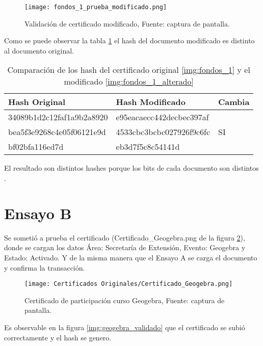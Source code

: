 \begin{figure}[H]
  \centering
  {\texttt{[image: fondos\_1\_prueba\_modificado.png]}}
  \caption{Validación de certificado modificado,  Fuente: captura de pantalla. }
  \label{img:fondos_1_modificado_validacion}
\end{figure}

Como se puede observar la tabla  \ref{table:tabla-ensayo-a} el hash del documento modificado es distinto al documento original.

\begin{table}[H]
  \centering
  \begin{tabular}{ |l|l|l| }
  \hline
  Hash Original & Hash Modificado & Cambia \\
  \hline
  34089b1d2c12faf1a9b2a8920 & e95eacaecc442decbec397af  &    \\
  bea5f3e9268c4e05f06121e9d & 4533cbc3bcbc027926f9c6fc  & SI \\
  bf02bfa116ed7d            & eb3d7f5c8c54141d          &    \\
  \hline
  \end{tabular}
  \caption{Comparación de los hash del certificado original \ref{img:fondos_1} y el modificado \ref{img:fondos_1_alterado}  }
  \label{table:tabla-ensayo-a}
  \end{table}

El resultado son distintos hashes porque los bits de cada documento son distintos \cite[]{back_hashcash_2002,nakamoto_bitcoin_2008,blockcerts_faq_nodate}. 

\section{Ensayo B}
Se sometió a prueba el certificado  (Certificado\_Geogebra.png de la figura \ref{img:certificado_geogebra}),
donde se cargan los datos Área: Secretaría de Extensión, Evento: Geogebra y Estado: Activado.
Y de la misma manera que el Ensayo A se carga el documento y confirma la transacción.

\begin{figure}[H]
  \centering
  {\texttt{[image: Certificados Originales/Certificado\_Geogebra.png]}}
  \caption{Certificado de participación curso Geogebra,  Fuente: captura de pantalla. }
  \label{img:certificado_geogebra}
\end{figure}

Es observable  en la figura \ref{img:geogebra_validado} que el certificado se subió correctamente y el hash se genero.

